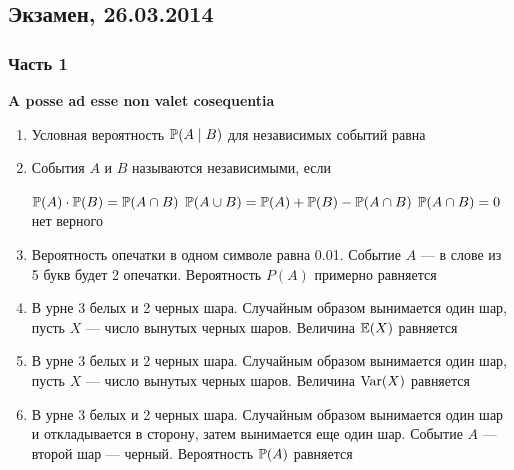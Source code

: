 \documentclass[12pt, a4paper]{article}\usepackage[]{graphicx}\usepackage[]{color}
\begin{document}
\subsection{Экзамен, 26.03.2014}

\subsubsection*{Часть 1}

\textbf{A posse ad esse non valet cosequentia}

\begin{enumerate}

\item Условная вероятность $\P(A\mid B)$ для независимых событий равна


\item События $A$ и $B$ называются независимыми, если

{$\P(A)\cdot\P(B)=\P(A\cap B)$}
{$\P(A\cup B)=\P(A)+\P(B)-\P(A\cap B)$}
{$\P(A\cap B)=0$}
{нет верного} \\

\item Вероятность опечатки в одном символе равна 0.01. Событие $A$ — в слове из 5 букв будет 2 опечатки. Вероятность $P(A)$ примерно равняется


\item В урне 3 белых и 2 черных шара. Случайным образом вынимается один шар, пусть $X$ — число вынутых черных шаров. Величина $\E(X)$ равняется


\item В урне 3 белых и 2 черных шара. Случайным образом вынимается один шар, пусть $X$ — число вынутых черных шаров. Величина $\Var(X)$ равняется


\item В урне 3 белых и 2 черных шара. Случайным образом вынимается один шар и откладывается в сторону, затем вынимается еще один шар. Событие $A$ — второй шар — черный. Вероятность $\P(A)$ равняется



\end{enumerate}
\end{document}
